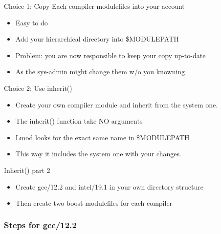 \documentclass{beamer}
\begin{document}
\begin{frame}{Choice 1: Copy Each compiler modulefiles into your account}
  \begin{itemize}
    \item Easy to do
    \item Add your hierarchical directory into \$MODULEPATH
    \item Problem: you are now responsible to keep your copy
      up-to-date
    \item As the sys-admin might change them w/o you knowning
  \end{itemize}
\end{frame}

\begin{frame}{Choice 2: Use inherit()}
  \begin{itemize}
    \item Create your own compiler module and inherit from the system
      one.
    \item The inherit() function take NO arguments
    \item Lmod looks for the exact same name in \$MODULEPATH
    \item This way it includes the system one with your changes.
  \end{itemize}
\end{frame}

\begin{frame}{Inherit() part 2}
  \begin{itemize}
    \item Create gcc/12.2 and intel/19.1 in your own directory
      structure
    \item Then create two boost modulefiles for each compiler
  \end{itemize}
\end{frame}

\begin{frame}[fragile]
    \frametitle{Steps for gcc/12.2}
 {\tiny
}
\end{frame}
\end{document}
